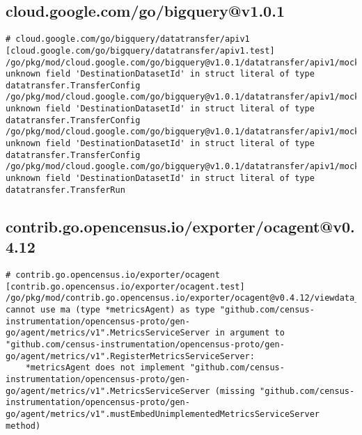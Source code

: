 \subsection{cloud.google.com/go/bigquery@v1.0.1}
\begin{verbatim}
# cloud.google.com/go/bigquery/datatransfer/apiv1 [cloud.google.com/go/bigquery/datatransfer/apiv1.test]
/go/pkg/mod/cloud.google.com/go/bigquery@v1.0.1/datatransfer/apiv1/mock_test.go:428:3: unknown field 'DestinationDatasetId' in struct literal of type datatransfer.TransferConfig
/go/pkg/mod/cloud.google.com/go/bigquery@v1.0.1/datatransfer/apiv1/mock_test.go:507:3: unknown field 'DestinationDatasetId' in struct literal of type datatransfer.TransferConfig
/go/pkg/mod/cloud.google.com/go/bigquery@v1.0.1/datatransfer/apiv1/mock_test.go:638:3: unknown field 'DestinationDatasetId' in struct literal of type datatransfer.TransferConfig
/go/pkg/mod/cloud.google.com/go/bigquery@v1.0.1/datatransfer/apiv1/mock_test.go:845:3: unknown field 'DestinationDatasetId' in struct literal of type datatransfer.TransferRun

\end{verbatim}

\subsection{contrib.go.opencensus.io/exporter/ocagent@v0.4.12}
\begin{verbatim}
# contrib.go.opencensus.io/exporter/ocagent [contrib.go.opencensus.io/exporter/ocagent.test]
/go/pkg/mod/contrib.go.opencensus.io/exporter/ocagent@v0.4.12/viewdata_to_metrics_test.go:51:45: cannot use ma (type *metricsAgent) as type "github.com/census-instrumentation/opencensus-proto/gen-go/agent/metrics/v1".MetricsServiceServer in argument to "github.com/census-instrumentation/opencensus-proto/gen-go/agent/metrics/v1".RegisterMetricsServiceServer:
	*metricsAgent does not implement "github.com/census-instrumentation/opencensus-proto/gen-go/agent/metrics/v1".MetricsServiceServer (missing "github.com/census-instrumentation/opencensus-proto/gen-go/agent/metrics/v1".mustEmbedUnimplementedMetricsServiceServer method)

\end{verbatim}
